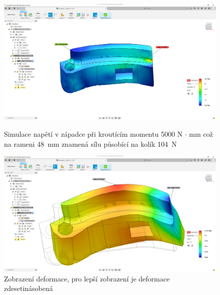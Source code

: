 \begin{figure}[htbp]
    \centering
    \includegraphics[width=\textwidth]{kapitoly/obrazky/E4/zapadka/simulace/napeti_D1-M5000.png}
    \caption{Simulace napětí v západce při kroutícím momentu 5000 N $\cdot$ mm což na rameni 48~mm znamená sílu působící na kolík 104~N}
    \includegraphics[width=\textwidth]{kapitoly/obrazky/E4/zapadka/simulace/Dislokace_D10-M5000.png}
    \caption{Zobrazení deformace, pro lepší zobrazení je deformace zdesetinásobená}
    \label{fig:E4-simulace_zapadky}
\end{figure}


\newpage